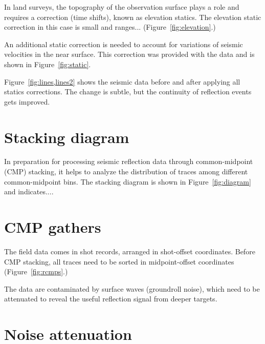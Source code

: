 In land surveys, the topography of the observation surface plays a
role and requires a correction (time shifts), known as elevation
statics. The elevation static correction in this case is small and
ranges... (Figure~\ref{fig:elevation}.)


An additional static correction is needed to account for variations of
seismic velocities in the near surface. This correction was provided
with the data and is shown in Figure~\ref{fig:static}.


Figure~\ref{fig:lines,lines2} shows the seismic data before and after
applying all statics corrections. The change is subtle, but the
continuity of reflection events gets improved.


\section{Stacking diagram}

In preparation for processing seismic reflection data through
common-midpoint (CMP) stacking, it helps to analyze the distribution of
traces among different common-midpoint bins. The stacking diagram is
shown in Figure~\ref{fig:diagram} and indicates....


\section{CMP gathers}

The field data comes in shot records, arranged in shot-offset
coordinates. Before CMP stacking, all traces need to be sorted in
midpoint-offset coordinates (Figure~\ref{fig:rcmps}.)
 

The data are contaminated by surface waves (groundroll noise), which
need to be attenuated to reveal the useful reflection signal from
deeper targets.

\section{Noise attenuation}

